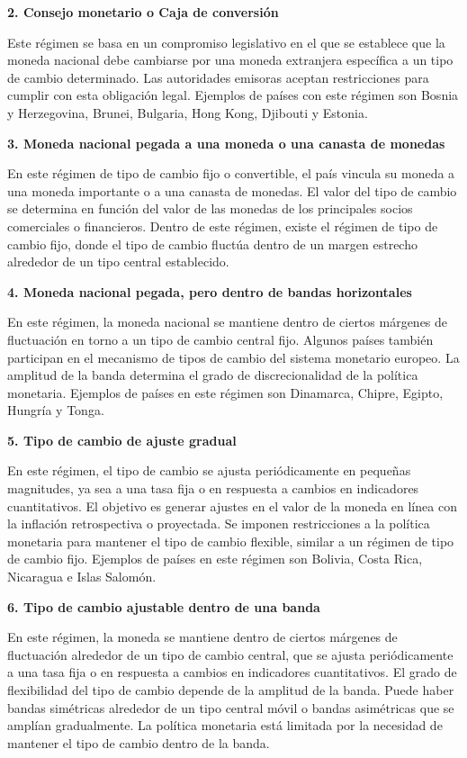 \documentclass[
  jou,
  floatsintext,
  longtable,
  a4paper,
  nolmodern,
  notxfonts,
  notimes,
  12pt,
  colorlinks=true,linkcolor=blue,citecolor=blue,urlcolor=blue]{apa7}
\begin{document}
\textbf{2. Consejo monetario o Caja de conversión}

Este régimen se basa en un compromiso legislativo en el que se establece
que la moneda nacional debe cambiarse por una moneda extranjera
específica a un tipo de cambio determinado. Las autoridades emisoras
aceptan restricciones para cumplir con esta obligación legal. Ejemplos
de países con este régimen son Bosnia y Herzegovina, Brunei, Bulgaria,
Hong Kong, Djibouti y Estonia.

\textbf{3. Moneda nacional pegada a una moneda o una canasta de monedas}

En este régimen de tipo de cambio fijo o convertible, el país vincula su
moneda a una moneda importante o a una canasta de monedas. El valor del
tipo de cambio se determina en función del valor de las monedas de los
principales socios comerciales o financieros. Dentro de este régimen,
existe el régimen de tipo de cambio fijo, donde el tipo de cambio
fluctúa dentro de un margen estrecho alrededor de un tipo central
establecido.

\textbf{4. Moneda nacional pegada, pero dentro de bandas horizontales}

En este régimen, la moneda nacional se mantiene dentro de ciertos
márgenes de fluctuación en torno a un tipo de cambio central fijo.
Algunos países también participan en el mecanismo de tipos de cambio del
sistema monetario europeo. La amplitud de la banda determina el grado de
discrecionalidad de la política monetaria. Ejemplos de países en este
régimen son Dinamarca, Chipre, Egipto, Hungría y Tonga.

\textbf{5. Tipo de cambio de ajuste gradual}

En este régimen, el tipo de cambio se ajusta periódicamente en pequeñas
magnitudes, ya sea a una tasa fija o en respuesta a cambios en
indicadores cuantitativos. El objetivo es generar ajustes en el valor de
la moneda en línea con la inflación retrospectiva o proyectada. Se
imponen restricciones a la política monetaria para mantener el tipo de
cambio flexible, similar a un régimen de tipo de cambio fijo. Ejemplos
de países en este régimen son Bolivia, Costa Rica, Nicaragua e Islas
Salomón.

\textbf{6. Tipo de cambio ajustable dentro de una banda}

En este régimen, la moneda se mantiene dentro de ciertos márgenes de
fluctuación alrededor de un tipo de cambio central, que se ajusta
periódicamente a una tasa fija o en respuesta a cambios en indicadores
cuantitativos. El grado de flexibilidad del tipo de cambio depende de la
amplitud de la banda. Puede haber bandas simétricas alrededor de un tipo
central móvil o bandas asimétricas que se amplían gradualmente. La
política monetaria está limitada por la necesidad de mantener el tipo de
cambio dentro de la banda.
\end{document}
